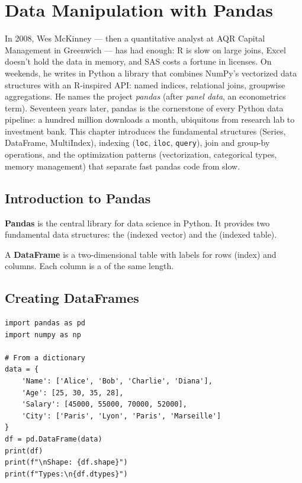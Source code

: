 \chapter{Data Manipulation with Pandas}
\label{ch:pandas}

In 2008, Wes McKinney --- then a quantitative analyst at AQR Capital Management in Greenwich --- has had enough: R is slow on large joins, Excel doesn't hold the data in memory, and SAS costs a fortune in licenses. On weekends, he writes in Python a library that combines NumPy's vectorized data structures with an R-inspired API: named indices, relational joins, groupwise aggregations. He names the project \emph{pandas} (after \emph{panel data}, an econometrics term). Seventeen years later, pandas is the cornerstone of every Python data pipeline: a hundred million downloads a month, ubiquitous from research lab to investment bank. This chapter introduces the fundamental structures (Series, DataFrame, MultiIndex), indexing (\texttt{loc}, \texttt{iloc}, \texttt{query}), join and group-by operations, and the optimization patterns (vectorization, categorical types, memory management) that separate fast pandas code from slow.

\section{Introduction to Pandas}

\textbf{Pandas} is the central library for data science in Python. It provides two fundamental data structures: the  (indexed vector) and the  (indexed table).

\begin{definition}[DataFrame]
A \textbf{DataFrame} is a two-dimensional table with labels for rows (index) and columns. Each column is a  of the same length.
\end{definition}

\section{Creating DataFrames}

\begin{codeblock}[title=\textbf{Python --- Creation}]
\begin{verbatim}
import pandas as pd
import numpy as np

# From a dictionary
data = {
    'Name': ['Alice', 'Bob', 'Charlie', 'Diana'],
    'Age': [25, 30, 35, 28],
    'Salary': [45000, 55000, 70000, 52000],
    'City': ['Paris', 'Lyon', 'Paris', 'Marseille']
}
df = pd.DataFrame(data)
print(df)
print(f"\nShape: {df.shape}")
print(f"Types:\n{df.dtypes}")
\end{verbatim}
\end{codeblock}

